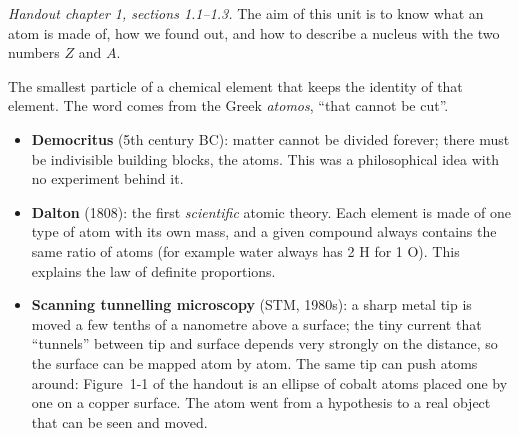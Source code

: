 
\textit{Handout chapter 1, sections 1.1--1.3.} The aim of this unit is to know what an atom is made of,
how we found out, and how to describe a nucleus with the two numbers $Z$ and $A$.


\begin{concept}[Atom.]
The smallest particle of a chemical element that keeps the identity of that element. The word comes
from the Greek \emph{atomos}, ``that cannot be cut''.
\end{concept}
\begin{itemize}
  \item \textbf{Democritus} (5th century BC): matter cannot be divided forever; there must be
        indivisible building blocks, the atoms. This was a philosophical idea with no experiment behind it.
  \item \textbf{Dalton} (1808): the first \emph{scientific} atomic theory. Each element is made of
        one type of atom with its own mass, and a given compound always contains the same ratio of
        atoms (for example water always has 2 H for 1 O). This explains the law of definite proportions.
  \item \textbf{Scanning tunnelling microscopy} (STM, 1980s): a sharp metal tip is moved a few
        tenths of a nanometre above a surface; the tiny current that ``tunnels'' between tip and surface
        depends very strongly on the distance, so the surface can be mapped atom by atom. The same tip
        can push atoms around: Figure~1-1 of the handout is an ellipse of cobalt atoms placed one by one
        on a copper surface. The atom went from a hypothesis to a real object that can be seen and moved.
\end{itemize}


